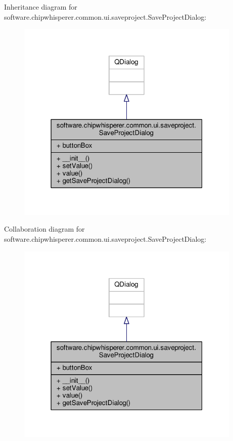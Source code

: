 Inheritance diagram for software.\+chipwhisperer.\+common.\+ui.\+saveproject.\+Save\+Project\+Dialog\+:\nopagebreak
\begin{figure}[H]
\begin{center}
\leavevmode
\includegraphics[width=304pt]{d9/d92/classsoftware_1_1chipwhisperer_1_1common_1_1ui_1_1saveproject_1_1SaveProjectDialog__inherit__graph}
\end{center}
\end{figure}


Collaboration diagram for software.\+chipwhisperer.\+common.\+ui.\+saveproject.\+Save\+Project\+Dialog\+:\nopagebreak
\begin{figure}[H]
\begin{center}
\leavevmode
\includegraphics[width=304pt]{de/dba/classsoftware_1_1chipwhisperer_1_1common_1_1ui_1_1saveproject_1_1SaveProjectDialog__coll__graph}
\end{center}
\end{figure}


